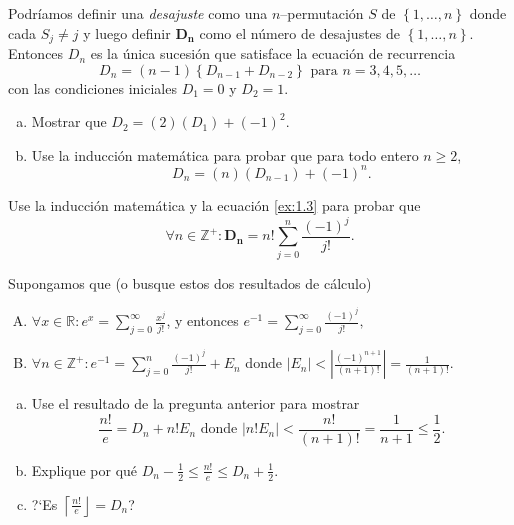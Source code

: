 \begin{exercise}
Podríamos definir una \emph{desajuste} como una $n$--permutación $S$ de $\left\{1,\ldots,n\right\}$ donde cada $S_{j}\neq j$ y luego definir $\bm{D_n}$ como el número de desajustes de $\left\{1,\ldots,n\right\}$. Entonces $D_{n}$ es la única sucesión que satisface la ecuación de recurrencia
\begin{equation}\label{ex:1.3}
D_{n}=\left(n-1\right)\left\{D_{n-1}+D_{n-2}\right\}\text{ para }n=3,4,5,\ldots
\end{equation}
con las condiciones iniciales $D_{1}=0$ y $D_{2}=1$.
\begin{enumerate}[(a)]
	\item Mostrar que $D_{2}=(2)\left(D_{1}\right)+(-1)^2$.
	\item Use la inducción matemática para probar que para todo entero $n\geq2$, \[ D_{n}=(n)(D_{n-1})+{(-1)}^n. \]
\end{enumerate}
\end{exercise}

\begin{solution}

\end{solution}

\begin{exercise}
Use la inducción matemática y la ecuación \eqref{ex:1.3} para probar que \[ \forall n\in\mathds{Z}^{+}\colon\bm{D_n}=n!\sum_{j=0}^n\frac{(-1)^j}{j!}. \]
\end{exercise}

\begin{solution}
	
\end{solution}

\begin{exercise}
Supongamos que (o busque estos dos resultados de cálculo)
\begin{enumerate}[A.]
	\item $\forall x\in\mathds{R}\colon e^x=\sum_{j=0}^\infty\frac{x^j}{j!}$, y entonces $e^{-1}=\sum_{j=0}^\infty\frac{(-1)^j}{j!},$
	\item $\forall n\in\mathds{Z}^{+}\colon e^{-1}=\sum_{j=0}^n\frac{(-1)^j}{j!}+E_n$ donde $|E_n|<\left|\frac{(-1)^{n+1}}{(n+1)!}\right|=\frac{1}{(n+1)!}$.
\end{enumerate}

\begin{enumerate}[(a)]
	\item Use el resultado de la pregunta anterior para mostrar \[ \frac{n!}{e}=D_{n}+n!E_{n}\text{ donde }|n!E_n|<\frac{n!}{(n+1)!}=\frac{1}{n+1}\leq\frac{1}{2}. \]
	\item Explique por qué $D_{n}-\frac{1}{2}\leq\frac{n!}{e}\leq D_{n}+\frac{1}{2}$.
	\item ?`Es $\left\lceil\frac{n!}{e}\right\rfloor=D_{n}$?
\end{enumerate}

\end{exercise}

